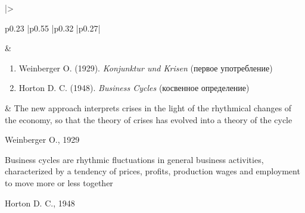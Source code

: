 \begin{longtable}{
    |>{\raggedright\arraybackslash}p{0.23\textwidth}
    |p{0.55\textwidth}
    |p{0.32\textwidth}
    |p{0.27\textwidth}|
    }
&
\begin{minipage}[t]{\linewidth}
    \vspace{-7pt}
    \RaggedRight
    \begin{enumerate}
        \item Weinberger O. (1929). \textit{Konjunktur und Krisen}\cite{Weinberger-1929} (первое употребление)
        \item Horton D. C. (1948). \textit{Business Cycles}\cite{Horton-1948} (косвенное определение)
    \end{enumerate}
\end{minipage}
&
\textquotedbl{}The new approach interprets crises in the light of the rhythmical changes of the economy, so that the theory of crises has evolved into a theory of the cycle\textquotedbl{}
\begin{flushright}
    Weinberger O., 1929\cite{Weinberger-1929}
\end{flushright}
\vspace{7pt}
\textquotedbl{}Business cycles are rhythmic fluctuations in general business activities, characterized by a tendency of prices, profits, production wages and employment to move more or less together\textquotedbl{}
\begin{flushright}
    Horton D. C., 1948\cite{Horton-1948}
\end{flushright}
\\ \hline


\end{longtable}
